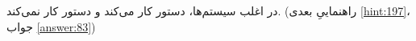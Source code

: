 \section{}
\paragraph{}\label{hint:74}
در اغلب سیستم‌ها، دستور  کار می‌کند و دستور  کار نمی‌کند. (راهنماییِ بعدی \ref{hint:197}، جواب \ref{answer:83})